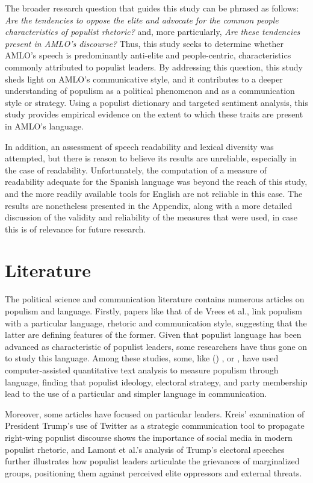 \documentclass[]{article}
\begin{document}
The broader research question that guides this study can be phrased as follows: \textit{Are the tendencies to oppose the elite and advocate for the common people characteristics of populist rhetoric?} and, more particularly, \textit{Are these tendencies present in AMLO's discourse?} Thus, this study seeks to determine whether AMLO's speech is predominantly anti-elite and people-centric, characteristics commonly attributed to populist leaders. By addressing this question, this study sheds light on AMLO's communicative style, and it contributes to a deeper understanding of populism as a political phenomenon and as a communication style or strategy. Using a populist dictionary and targeted sentiment analysis, this study provides empirical evidence on the extent to which these traits are present in AMLO's language. 

In addition, an assessment of speech readability and lexical diversity was attempted, but there is reason to believe its results are unreliable, especially in the case of readability. Unfortunately, the computation of a measure of readability adequate for the Spanish language was beyond the reach of this study, and the more readily available tools for English are not reliable in this case. The results are nonetheless presented in the Appendix, along with a more detailed discussion of the validity and reliability of the measures that were used, in case this is of relevance for future research. 

\section{Literature}

The political science and communication literature contains numerous articles on populism and language. Firstly, papers like that of de Vrees et al., \cite{de_vreese_populism_2018} link populism with a particular language, rhetoric and communication style, suggesting that the latter are defining features of the former. Given that populist language has been advanced as characteristic of populist leaders, some researchers have thus gone on to study this language. Among these studies, some, like (\cite{decadri_populism_2020}) , or \cite{rooduijn_measuring_2011}, have used computer-assisted quantitative text analysis to measure populism through language, finding that populist ideology, electoral strategy, and party membership lead to the use of a particular and simpler language in communication. 

Moreover, some articles have focused on particular leaders. Kreis' \cite{kreis_tweet_2017} examination of President Trump's use of Twitter as a strategic communication tool to propagate right-wing populist discourse shows the importance of social media in modern populist rhetoric, and Lamont et al.'s \cite{lamont_trumps_2017} analysis of Trump's electoral speeches further illustrates how populist leaders articulate the grievances of marginalized groups, positioning them against perceived elite oppressors and external threats.
\end{document}
